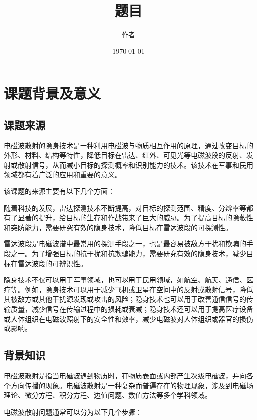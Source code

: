\documentclass{article}
\title{题目}
\author{作者}
\date{\today}
\begin{document}
\maketitle
\newpage

\renewcommand{\baselinestretch}{1.35}
\tableofcontents
\newpage

\setlength{\parskip}{0em}
\renewcommand{\baselinestretch}{1.53}


\section{课题背景及意义}
\subsection{课题来源}
电磁波散射的隐身技术是一种利用电磁波与物质相互作用的原理，通过改变目标的外形、材料、结构等特性，降低目标在雷达、红外、可见光等电磁波段的反射、发射或散射信号，从而减小目标的探测概率和识别能力的技术。该技术在军事和民用领域都有着广泛的应用和重要的意义。

该课题的来源主要有以下几个方面：

随着科技的发展，雷达探测技术不断提高，对目标的探测范围、精度、分辨率等都有了显著的提升，给目标的生存和作战带来了巨大的威胁。为了提高目标的隐蔽性和突防能力，需要研究有效的隐身技术，降低目标在雷达波段的可探测性。

雷达波段是电磁波谱中最常用的探测手段之一，也是最容易被敌方干扰和欺骗的手段之一。为了增强目标的抗干扰和抗欺骗能力，需要研究有效的隐身技术，减少目标在雷达波段的可辨识性。

隐身技术不仅可以用于军事领域，也可以用于民用领域，如航空、航天、通信、医疗等。例如，隐身技术可以用于减少飞机或卫星在空间中的反射或散射信号，降低其被敌方或其他干扰源发现或攻击的风险；隐身技术也可以用于改善通信信号的传输质量，减少信号在传输过程中的损耗或衰减；隐身技术还可以用于提高医疗设备或人体组织在电磁波照射下的安全性和效率，减少电磁波对人体组织或器官的损伤或影响。

\subsection{背景知识}
电磁波散射是指当电磁波遇到物质时，在物质表面或内部产生次级电磁波，并向各个方向传播的现象。电磁波散射是一种复杂而普遍存在的物理现象，涉及到电磁场理论、微分方程、积分方程、边值问题、数值方法等多个学科领域。

电磁波散射问题通常可以分为以下几个步骤：
\end{document}
